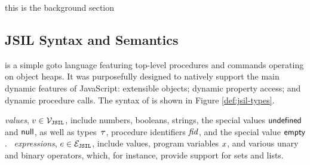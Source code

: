
this is the background section

\subsection{JSIL Syntax and Semantics}

 \jsil is a simple goto language featuring top-level procedures and commands operating on object heaps. It was purposefully designed to natively support the main dynamic features of JavaScript: extensible objects; dynamic property access; and dynamic procedure calls. The syntax of \jsil is shown in Figure \ref{def:jsil-types}.

\jsil \emph{values}, $v \in \mathcal{V}_{\mathtt{JSIL}}$, include numbers, booleans, strings, the special values ${{\sf undefined}}$ and ${\sf null}$, as well as types~$\tau$, procedure identifiers $\mathit{fid}$, and the special value ${\sf empty}$. 
\jsil~\emph{expressions}, $e \in \mathcal{E}_{\mathtt{JSIL}}$, include \jsil values, \jsil program variables $x$, and various unary and binary operators, which, for instance, provide support for sets and lists. 




